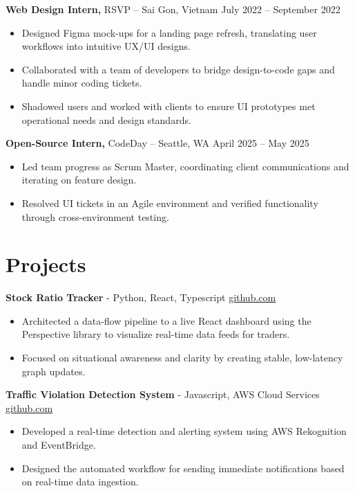 \documentclass[11pt]{article}
\begin{document}
\textbf{Web Design Intern,} {RSVP} -- Sai Gon, Vietnam \hfill July 2022 -- September 2022 \\
\vspace{-9pt}
\begin{itemize}
  \item Designed Figma mock-ups for a landing page refresh, translating user workflows into intuitive UX/UI designs.
  \item Collaborated with a team of developers to bridge design-to-code gaps and handle minor coding tickets.
  \item Shadowed users and worked with clients to ensure UI prototypes met operational needs and design standards.
\end{itemize}

\textbf{Open-Source Intern,} {CodeDay} -- Seattle, WA \hfill April 2025 -- May 2025 \\
\vspace{-9pt}
\begin{itemize}
  \item Led team progress as Scrum Master, coordinating client communications and iterating on feature design.
  \item Resolved UI tickets in an Agile environment and verified functionality through cross-environment testing.
\end{itemize}

\vspace{-18.5pt}
\section*{Projects}

\textbf{Stock Ratio Tracker}{ - Python, React, Typescript} \hfill \href{https://github.com/Monica20030707/tradingDashboard-UI}{github.com} \\
\vspace{-9pt}
\begin{itemize}
  \item Architected a data-flow pipeline to a live React dashboard using the Perspective library to visualize real-time data feeds for traders.
  \item Focused on situational awareness and clarity by creating stable, low-latency graph updates.
\end{itemize}

\textbf{Traffic Violation Detection System}{ - Javascript, AWS Cloud Services} \hfill \href{https://github.com/Monica20030707/AWS_rekonigition-N-read-database}{github.com} \\
\vspace{-9pt}
\begin{itemize}
  \item Developed a real-time detection and alerting system using AWS Rekognition and EventBridge.
  \item Designed the automated workflow for sending immediate notifications based on real-time data ingestion.
\end{itemize}
\end{document}

